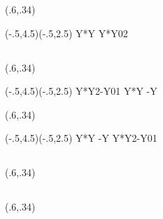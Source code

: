 \documentclass[a4j]{jarticle}
\begin{document}
\begin{showEx}(.6,.34){}
\begin{pszahyou}[ul=8mm](-.5,4.5)(-.5,2.5)
  \def\Fy{Y*Y}
  \XGurafu*[sitay=0]\Fy
  \Drawline{\O\A}
  \XNuri*[-45]\Fy{0}{2}
  \Put\A[syaei=xy]{}
\end{pszahyou}
\end{showEx}

\subsection{\texorpdfstring{}{Xnurii}}
\begin{showEx}(.6,.34){}
\begin{pszahyou}[ul=8mm](-.5,4.5)(-.5,2.5)
  \def\Fy{Y*Y}
  \def\Gy{2-Y}
  \XNurii\Fy\Gy{0}{1}
  \XGurafu*[sitay=0]\Fy
  \XGurafu*\Gy
  \Put\A[syaei=xy]{}
\end{pszahyou}
\end{showEx}

\begin{showEx}(.6,.34){}
\begin{pszahyou}[ul=8mm](-.5,4.5)(-.5,2.5)
  \def\Fy{Y*Y}
  \def\Gy{2-Y}
  \XGurafu*[sitay=0]\Fy
  \XGurafu*\Gy
  \XNurii*[60]\Fy\Gy{0}{1}
  \Put\A[syaei=xy]{}
\end{pszahyou}
\end{showEx}

\subsection{\texorpdfstring{}{BGurafu}}
\begin{showEx}(.6,.34){}
\end{showEx}

\subsection{\texorpdfstring{}{RGurafu}}
\begin{showEx}(.6,.34){}
\end{showEx}
\end{document}
